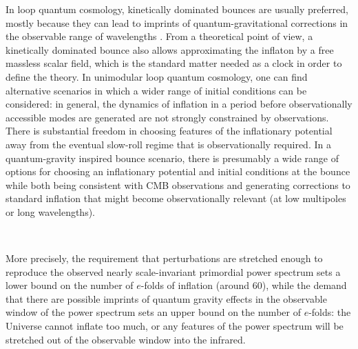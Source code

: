 \documentclass[aps,prd,11pt,showkeys,nofootinbib]{revtex4-2}
\begin{document}
In loop quantum cosmology, kinetically dominated bounces are usually preferred, mostly because they can lead to imprints of quantum-gravitational corrections in the observable range of wavelengths \cite{Agullo:2013ai,Ashtekar:2021kfp}. From a theoretical point of view, a kinetically dominated bounce also allows approximating the inflaton by a free massless scalar field, which is the standard matter needed as a clock in order to define the theory. In unimodular loop quantum cosmology, one can find alternative scenarios in which a wider range of initial conditions can be considered: in general, the dynamics of inflation in a period before observationally accessible modes are generated are not strongly constrained by observations. There is substantial freedom in choosing features of the inflationary potential away from the eventual slow-roll regime that is observationally required. In a quantum-gravity inspired bounce scenario, there is presumably a wide range of options for choosing an inflationary potential and initial conditions at the bounce while both being consistent with CMB observations and generating corrections to standard inflation that might become observationally relevant (at low multipoles or long wavelengths).    

\

More precisely, the requirement that perturbations are stretched enough to reproduce the observed nearly scale-invariant primordial power spectrum sets a lower bound on the number of $e$-folds of inflation (around 60), while the demand that there are possible imprints of quantum gravity effects in the observable window of the power spectrum sets an upper bound on the number of $e$-folds: the Universe cannot inflate too much, or any features of the power spectrum will be stretched out of the observable window into the infrared. 
\end{document}
